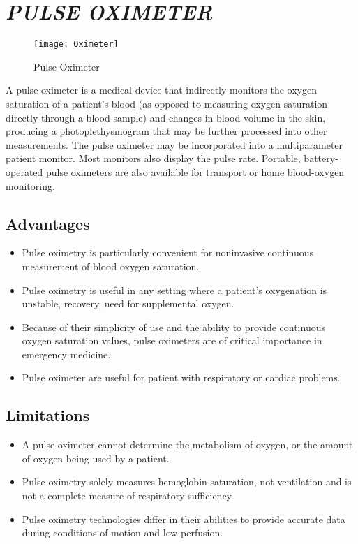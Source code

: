 \documentclass[12pt]{article}
\begin{document}
 
\section {\textsl{PULSE OXIMETER}}
\begin{figure}
\centering
\texttt{[image: Oximeter]}
\caption{Pulse Oximeter}
\end{figure}

A pulse oximeter is a medical device that indirectly monitors the oxygen saturation of a patient's blood (as opposed to measuring oxygen saturation directly through a blood sample) and changes in blood volume in the skin, producing a photoplethysmogram that may be further processed into other measurements.
\newline\newline
The pulse oximeter may be incorporated into a multiparameter patient monitor. Most monitors also display the pulse rate. Portable, battery-operated pulse oximeters are also available for transport or home blood-oxygen monitoring.


 \subsection{Advantages} 
 \begin{itemize}
 \item Pulse oximetry is particularly convenient for noninvasive continuous measurement of blood oxygen saturation.
 \item  Pulse oximetry is useful in any setting where a patient's oxygenation is unstable, recovery, need for supplemental oxygen.
 \item Because of their simplicity of use and the ability to provide continuous oxygen saturation values, pulse oximeters are of critical importance in emergency medicine.
 \item Pulse oximeter are useful for patient with respiratory or cardiac problems.

\end{itemize}
 
 \subsection{Limitations}

\begin{itemize}
 \item A pulse oximeter cannot determine the metabolism of oxygen, or the amount of oxygen being used by a patient.
 \item Pulse oximetry solely measures hemoglobin saturation, not ventilation and is not a complete measure of respiratory sufficiency.
 \item Pulse oximetry technologies differ in their abilities to provide accurate data during conditions of motion and low perfusion.
\end{itemize}
\end{document}
